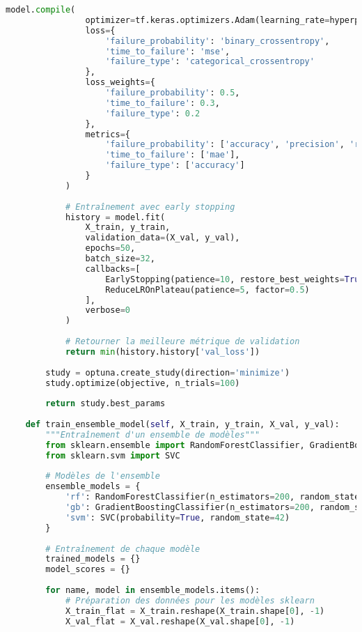 \documentclass[12pt,a4paper]{report}
\begin{document}
\begin{lstlisting}[language=Python, caption=Modèle de maintenance prédictive avancé]
            model.compile(
                optimizer=tf.keras.optimizers.Adam(learning_rate=hyperparams['learning_rate']),
                loss={
                    'failure_probability': 'binary_crossentropy',
                    'time_to_failure': 'mse',
                    'failure_type': 'categorical_crossentropy'
                },
                loss_weights={
                    'failure_probability': 0.5,
                    'time_to_failure': 0.3,
                    'failure_type': 0.2
                },
                metrics={
                    'failure_probability': ['accuracy', 'precision', 'recall'],
                    'time_to_failure': ['mae'],
                    'failure_type': ['accuracy']
                }
            )
            
            # Entraînement avec early stopping
            history = model.fit(
                X_train, y_train,
                validation_data=(X_val, y_val),
                epochs=50,
                batch_size=32,
                callbacks=[
                    EarlyStopping(patience=10, restore_best_weights=True),
                    ReduceLROnPlateau(patience=5, factor=0.5)
                ],
                verbose=0
            )
            
            # Retourner la meilleure métrique de validation
            return min(history.history['val_loss'])
        
        study = optuna.create_study(direction='minimize')
        study.optimize(objective, n_trials=100)
        
        return study.best_params
    
    def train_ensemble_model(self, X_train, y_train, X_val, y_val):
        """Entraînement d'un ensemble de modèles"""
        from sklearn.ensemble import RandomForestClassifier, GradientBoostingClassifier
        from sklearn.svm import SVC
        
        # Modèles de l'ensemble
        ensemble_models = {
            'rf': RandomForestClassifier(n_estimators=200, random_state=42),
            'gb': GradientBoostingClassifier(n_estimators=200, random_state=42),
            'svm': SVC(probability=True, random_state=42)
        }
        
        # Entraînement de chaque modèle
        trained_models = {}
        model_scores = {}
        
        for name, model in ensemble_models.items():
            # Préparation des données pour les modèles sklearn
            X_train_flat = X_train.reshape(X_train.shape[0], -1)
            X_val_flat = X_val.reshape(X_val.shape[0], -1)
            

\end{lstlisting}
\end{document}
